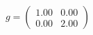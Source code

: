 \documentclass[preview]{standalone}
\begin{document}
\begin{align*}
g = \begin{pmatrix} 1.00 & 0.00 \\ 0.00 & 2.00 \end{pmatrix}
\end{align*}
\end{document}
